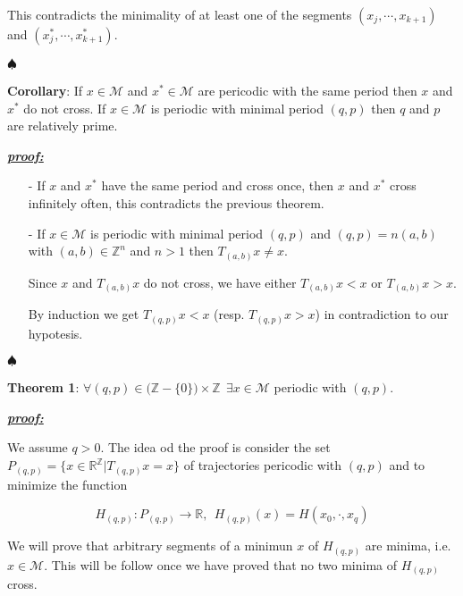 \documentclass{article}
\begin{document}
\begin{itemize}
\begin{itemize}
				This contradicts the minimality of at least one of the segments $(x_{j}, \cdots, x_{k + 1})$ and $(x_{j}^{*}, \cdots, x_{k + 1}^{*})$.
							 
			\end{itemize}
	
			\noindent $\spadesuit$
		\color{black}
		
		
		\textbf{Corollary}: If $x \in \mathcal{M}$ and $x^{*} \in \mathcal{M}$ are pericodic with the same period then $x$ and $x^{*}$ do not cross. If $x \in \mathcal{M}$ is periodic with minimal period $(q, p)$ then $q$ and $p$ are relatively prime.
		
		\color{blue}
			\noindent \underline{\textbf{\textit{proof:}}} 		
				\begin{itemize}
					\item[-] If $x$ and $x^{*}$ have the same period and cross once, then $x$ and $x^{*}$ cross infinitely often, this contradicts the previous theorem.
					\item[-] If $x \in \mathcal{M}$ is periodic with minimal period $(q, p)$ and $(q, p) = n(a, b)$ with $(a, b) \in \mathbb{Z}^{n}$ and $n > 1$ then $T_{(a, b)} x \neq x$.
					
					Since $x$ and $T_{(a, b)}x$ do not cross, we have either $T_{(a, b)}x < x$ or $T_{(a, b)}x > x$.
					
					By induction we get $T_{(q, p)}x < x$ (resp. $T_{(q, p)}x > x$) in contradiction to our hypotesis.

				\end{itemize}
			
			\noindent $\spadesuit$
		\color{black}
		
		
	\end{itemize}

\noindent \textbf{Theorem 1}: $\forall (q, p) \in \big( \mathbb{Z} - \{ 0 \} \big) \times \mathbb{Z} \ \ \exists x \in \mathcal{M}$ periodic with $(q, p)$.

\color{blue}
	\noindent \underline{\textbf{\textit{proof:}}} 		

	We assume $q > 0$. The idea od the proof is consider the set $P_{(q, p)} = \{ x \in \mathbb{R}^{\mathbb{Z}} | T_{(q, p)} x = x \}$ of trajectories pericodic with $(q, p)$ and to minimize the function
	
	$$
		H_{(q, p)}: P_{(q, p)} \rightarrow \mathbb{R}, \ \ H_{(q, p)} (x) = H (x_0, \cdot, x_q)
	$$
	
	We will prove that arbitrary segments of a minimun $x$ of $H_{(q, p)}$ are minima, i.e. $x \in \mathcal{M}$. This will be follow once we have proved that no two minima of $H_{(q, p)}$  cross.
	
\end{document}
